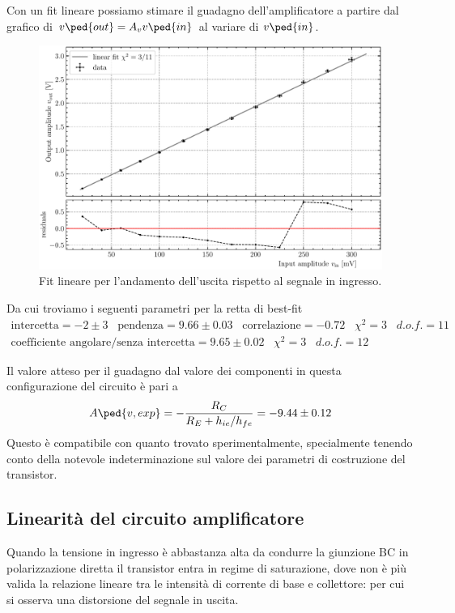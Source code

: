 \documentclass[10pt,a4paper]{article}
\begin{document}
Con un fit lineare possiamo stimare il guadagno dell'amplificatore a partire
dal grafico di $v\ped{out} = A_v v\ped{in}$ al variare di $v\ped{in}$.
\begin{figure}[htb]
\centering
\includegraphics[scale=0.6]{gain}
\caption{Fit lineare per l'andamento dell'uscita rispetto al segnale in
ingresso. \label{fig: gainfit}}
\end{figure}
Da cui troviamo i seguenti parametri per la retta di best-fit
\begin{align*}
\mathrm{intercetta} = -2 \pm 3 \;\;\;\mathrm{pendenza} = 9.66 \pm 0.03 \;\;\;\mathrm{correlazione} 
= -0.72 \;\;\; \chi^2 = 3 \;\;\; d.o.f. = 11 \\
\text{coefficiente angolare/senza intercetta} = 9.65 \pm 0.02 \;\;\;
\chi^2 = 3 \;\;\; d.o.f. = 12
\end{align*}

Il valore atteso per il guadagno dal valore dei componenti in questa
configurazione del circuito è pari a
\[
A\ped{v, exp} = -\frac{R_C}{R_E + h_{ie}/h_{fe}} = -9.44 \pm 0.12
\]
Questo è compatibile con quanto trovato sperimentalmente, specialmente
tenendo conto della notevole indeterminazione sul valore dei parametri di
costruzione del transistor.

\subsection{Linearità del circuito amplificatore}
Quando la tensione in ingresso è abbastanza alta da condurre la giunzione
BC in polarizzazione diretta il transistor entra in regime di saturazione,
dove non è più valida la relazione lineare tra le intensità di corrente di
base e collettore: per cui si osserva una distorsione del segnale in uscita.
\end{document}
